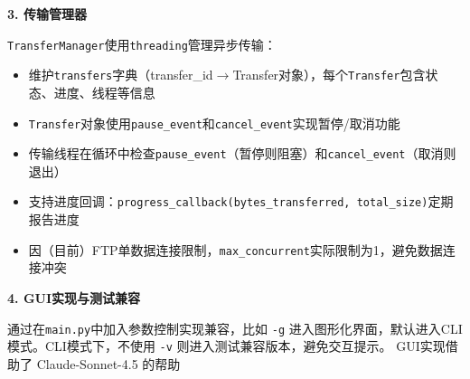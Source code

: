 \documentclass[11pt,a4paper]{article}
\begin{document}
\textbf{3. 传输管理器}

\texttt{TransferManager}使用\texttt{threading}管理异步传输：
\begin{itemize}[itemsep=0pt]
    \item 维护\texttt{transfers}字典（transfer\_id$\rightarrow$Transfer对象），每个\texttt{Transfer}包含状态、进度、线程等信息
    \item \texttt{Transfer}对象使用\texttt{pause\_event}和\texttt{cancel\_event}实现暂停/取消功能
    \item 传输线程在循环中检查\texttt{pause\_event}（暂停则阻塞）和\texttt{cancel\_event}（取消则退出）
    \item 支持进度回调：\texttt{progress\_callback(bytes\_transferred, total\_size)}定期报告进度
    \item 因（目前）FTP单数据连接限制，\texttt{max\_concurrent}实际限制为1，避免数据连接冲突
\end{itemize}

\textbf{4. GUI实现与测试兼容}

通过在\texttt{main.py}中加入参数控制实现兼容，比如 \texttt{-g} 进入图形化界面，默认进入CLI模式。CLI模式下，不使用 \texttt{-v} 则进入测试兼容版本，避免交互提示。
GUI实现借助了 Claude-Sonnet-4.5 的帮助
\end{document}
